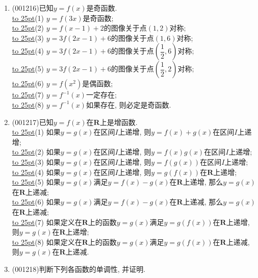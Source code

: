 \documentclass[10pt,a4paper]{article}
\newcommand{\blank}[1]{\underline{\hbox to #1pt{}}}
\begin{document}
\begin{enumerate}[1.]
\blank{25}(2) $y=f(2x)$是偶函数;\\ 
\blank{25}(3) $y=f(x-1)$的图像关于直线$x=-1$对称;\\ 
\blank{25}(4) $y=f(x-1)$的图像关于直线$x=1$对称;\\ 
\blank{25}(5) $y=f(3x+1)$的图像关于直线$x=-\dfrac{1}{3}$对称;\\ 
\blank{25}(6) $y=f(3x+1)$的图像关于直线$x=-1$对称;\\ 
\blank{25}(7) $y=f(x^3+1)$是偶函数;\\ 
\blank{25}(8) $y=f(x^3+x)$是偶函数.
\item {\tiny (001216)}已知$y=f(x)$是奇函数.\\ 
\blank{25}(1) $y=f(3x)$是奇函数;\\ 
\blank{25}(2) $y=f(x-1)+2$的图像关于点$(1,2)$对称;\\ 
\blank{25}(3) $y=3f(2x-1)+6$的图像关于点$(1,6)$对称;\\ 
\blank{25}(4) $y=3f(2x-1)+6$的图像关于点$(\dfrac{1}{2},6)$对称;\\ 
\blank{25}(5) $y=3f(2x-1)+6$的图像关于点$(\dfrac{1}{2},2)$对称;\\ 
\blank{25}(6) $y=f(x^2)$是偶函数;\\ 
\blank{25}(7) $y=f^{-1}(x)$一定存在;\\ 
\blank{25}(8) $y=f^{-1}(x)$如果存在, 则必定是奇函数.
\item {\tiny (001217)}已知$y=f(x)$在$\mathbf{R}$上是增函数.\\ 
\blank{25}(1) 如果$y=g(x)$在区间$I$上递增, 则$y=f(x)+g(x)$在区间$I$上递增;\\ 
\blank{25}(2) 如果$y=g(x)$在区间$I$上递增, 则$y=f(x)g(x)$在区间$I$上递增;\\ 
\blank{25}(3) 如果$y=g(x)$在区间$I$上递增, 则$y=f(g(x))$在区间$I$上递增;\\ 
\blank{25}(4) 如果$y=g(x)$在区间$I$上递增, 则$y=g(f(x))$在$\mathbf{R}$上递增;\\ 
\blank{25}(5) 如果$y=g(x)$满足$y=f(x)-g(x)$在$\mathbf{R}$上递增, 那么$y=g(x)$在$\mathbf{R}$上递减;\\ 
\blank{25}(6) 如果$y=g(x)$满足$y=f(x)-g(x)$在$\mathbf{R}$上递减, 那么$y=g(x)$在$\mathbf{R}$上递减;\\ 
\blank{25}(7) 如果定义在$\mathbf{R}$上的函数$y=g(x)$满足$y=g(f(x))$在$\mathbf{R}$上递增, 则$y=g(x)$在$\mathbf{R}$上递增;\\ 
\blank{25}(8) 如果定义在$\mathbf{R}$上的函数$y=g(x)$满足$y=g(f(x))$在$\mathbf{R}$上递减, 则$y=g(x)$在$\mathbf{R}$上递减.
\item {\tiny (001218)}判断下列各函数的单调性, 并证明.\\ 

\end{enumerate}
\end{document}
